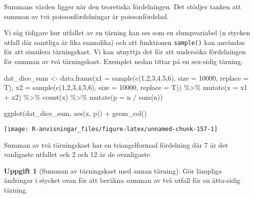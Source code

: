 \documentclass[
]{book}
\newenvironment{Shaded}{\begin{snugshade}}{\end{snugshade}}
\newcommand{\AttributeTok}[1]{\textcolor[rgb]{0.77,0.63,0.00}{#1}}
\newcommand{\DecValTok}[1]{\textcolor[rgb]{0.00,0.00,0.81}{#1}}
\newcommand{\FunctionTok}[1]{\textcolor[rgb]{0.00,0.00,0.00}{#1}}
\newcommand{\NormalTok}[1]{#1}
\newcommand{\OtherTok}[1]{\textcolor[rgb]{0.56,0.35,0.01}{#1}}
\newcommand{\SpecialCharTok}[1]{\textcolor[rgb]{0.00,0.00,0.00}{#1}}
\theoremstyle{definition}
\theoremstyle{definition}
\theoremstyle{definition}
\newtheorem{exercise}{Uppgift}[chapter]
\theoremstyle{definition}
\theoremstyle{remark}
\begin{document}
Summans värden ligger när den teoretiska fördelningen. Det stödjer tanken att summan av två poissonfördelningar är poissonfördelad.

Vi såg tidigare hur utfallet av en tärning kan ses som en slumpvariabel (n stycken utfall där samtliga är lika sannolika) och att funktionen \texttt{sample()} kan användas för att simulera tärningskast. Vi kan utnyttja det för att undersöka fördelningen för summan av två tärningskast. Exemplet nedan tittar på en sex-sidig tärning.

\begin{Shaded}
\begin{Highlighting}[]
\NormalTok{dat\_dice\_sum }\OtherTok{\textless{}{-}} \FunctionTok{data.frame}\NormalTok{(}\AttributeTok{x1 =} \FunctionTok{sample}\NormalTok{(}\FunctionTok{c}\NormalTok{(}\DecValTok{1}\NormalTok{,}\DecValTok{2}\NormalTok{,}\DecValTok{3}\NormalTok{,}\DecValTok{4}\NormalTok{,}\DecValTok{5}\NormalTok{,}\DecValTok{6}\NormalTok{), }\AttributeTok{size =} \DecValTok{10000}\NormalTok{, }\AttributeTok{replace =}\NormalTok{ T),}
                           \AttributeTok{x2 =} \FunctionTok{sample}\NormalTok{(}\FunctionTok{c}\NormalTok{(}\DecValTok{1}\NormalTok{,}\DecValTok{2}\NormalTok{,}\DecValTok{3}\NormalTok{,}\DecValTok{4}\NormalTok{,}\DecValTok{5}\NormalTok{,}\DecValTok{6}\NormalTok{), }\AttributeTok{size =} \DecValTok{10000}\NormalTok{, }\AttributeTok{replace =}\NormalTok{ T)) }\SpecialCharTok{\%\textgreater{}\%} 
  \FunctionTok{mutate}\NormalTok{(}\AttributeTok{x =}\NormalTok{ x1 }\SpecialCharTok{+}\NormalTok{ x2) }\SpecialCharTok{\%\textgreater{}\%} 
  \FunctionTok{count}\NormalTok{(x) }\SpecialCharTok{\%\textgreater{}\%} 
  \FunctionTok{mutate}\NormalTok{(}\AttributeTok{p =}\NormalTok{ n }\SpecialCharTok{/} \FunctionTok{sum}\NormalTok{(n))}

\FunctionTok{ggplot}\NormalTok{(dat\_dice\_sum, }\FunctionTok{aes}\NormalTok{(x, p)) }\SpecialCharTok{+}
  \FunctionTok{geom\_col}\NormalTok{()}
\end{Highlighting}
\end{Shaded}

\begin{center}\texttt{[image: R-anvisningar\_files/figure-latex/unnamed-chunk-157-1]} \end{center}

Summan av två tärningskast har en triangelformad fördelning där 7 är det vanligaste utfallet och 2 och 12 är de ovanligaste.

\begin{exercise}[Summan av tärningskast med annan tärning]
Gör lämpliga ändringar i stycket ovan för att beräkna summan av två utfall för en åtta-sidig tärning.
\end{exercise}
\end{document}
